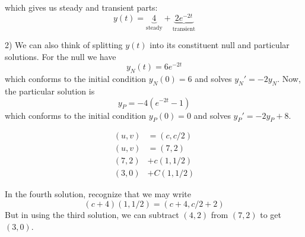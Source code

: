 \documentclass[a4paper]{article}
\begin{document}
which gives us steady and transient parts:
\[
	y \!\left( t \right) = \underbrace{4}_{\text{steady}} + \underbrace{2e^{-2t}}_{\text{transient}}
\]

2) We can also think of splitting \(y \!\left( t \right) \) into its constituent null and particular solutions. For the null we have
\[
	y_{N} \!\left( t \right) = 6e^{-2t}
\]
which conforms to the initial condition \(y_{N} \!\left( 0 \right) = 6\) and solves \(y_{N}' = -2y_{N}\). Now, the particular solution is
\[
	y_{P} = -4 \!\left( e^{-2t} - 1 \right) 
\]
which conforms to the initial condition \(y_{P}\!\left( 0 \right) = 0\) and solves \(y_{P}' = -2y_{P} + 8\).

\vspace{12pt}


\begin{align*}
	\!\left( u,v \right) & = \!\left( c, c/2 \right) \\
	\!\left( u,v \right) & = \!\left( 7,2 \right) \\
	\!\left( 7,2 \right) & + c \!\left( 1, 1/2 \right) \\
	\!\left( 3,0 \right) & + C \!\left( 1,1/2 \right) 
\end{align*}

In the fourth solution, recognize that we may write 
\[
	\!\left( c + 4 \right) \!\left( 1, 1/2 \right) = \!\left( c + 4, c/2 + 2 \right) 
\] 
But in using the third solution, we can subtract \(\!\left( 4,2 \right) \) from \(\!\left( 7,2 \right) \) to get \(\!\left( 3,0 \right) \).

\vspace{12pt}

\end{document}
